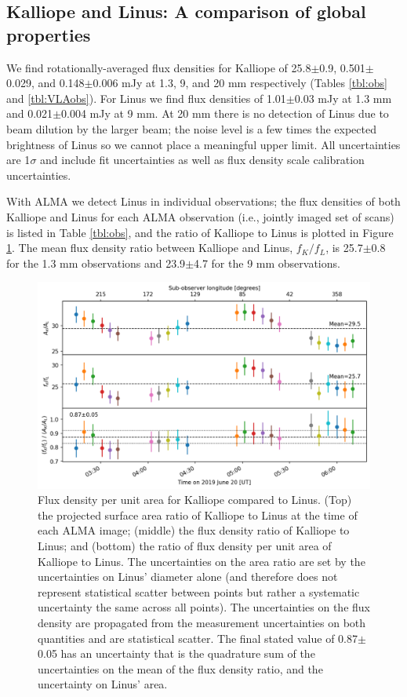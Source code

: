 \documentclass[]{aastex631}
\begin{document}
\subsection{Kalliope and Linus: A comparison of global properties}

We find rotationally-averaged flux densities for Kalliope of 25.8$\pm$0.9, 0.501$\pm$0.029, and 0.148$\pm$0.006 mJy at 1.3, 9, and 20 mm respectively (Tables \ref{tbl:obs} and \ref{tbl:VLAobs}). For Linus we find flux densities of 1.01$\pm$0.03 mJy at 1.3 mm and 0.021$\pm$0.004 mJy at 9 mm. At 20 mm there is no detection of Linus due to beam dilution by the larger beam; the noise level is a few times the expected brightness of Linus so we cannot place a meaningful upper limit. All uncertainties are 1$\sigma$ and include fit uncertainties as well as flux density scale calibration uncertainties. 

With ALMA we detect Linus in individual observations; the flux densities of both Kalliope and Linus for each ALMA observation (i.e., jointly imaged set of scans) is listed in Table \ref{tbl:obs}, and the ratio of Kalliope to Linus is plotted in Figure \ref{fig:ratios}. The mean flux density ratio between Kalliope and Linus, $f_K/f_L$, is 25.7$\pm$0.8 for the 1.3 mm observations and 23.9$\pm$4.7 for the 9 mm observations. 

\begin{figure}[ht!]
\centering
\includegraphics[width=16cm]{KalliopeLinusRatios.pdf}
\caption{Flux density per unit area for Kalliope compared to Linus. (Top) the projected surface area ratio of Kalliope to Linus at the time of each ALMA image; (middle) the flux density ratio of Kalliope to Linus; and (bottom) the ratio of flux density per unit area of Kalliope to Linus. The uncertainties on the area ratio are set by the uncertainties on Linus' diameter alone (and therefore does not represent statistical scatter between points but rather a systematic uncertainty the same across all points). The uncertainties on the flux density are propagated from the measurement uncertainties on both quantities and are statistical scatter. The final stated value of 0.87$\pm$0.05 has an uncertainty that is the quadrature sum of the uncertainties on the mean of the flux density ratio, and the uncertainty on Linus' area. \label{fig:ratios}}
\end{figure}
\end{document}
